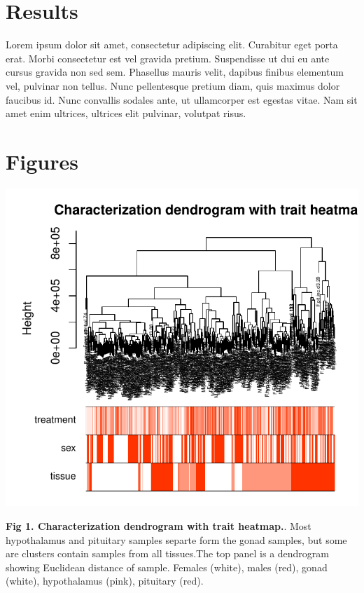 \documentclass[10pt,letterpaper]{article}
\begin{document}
\hypertarget{results}{%
\section{Results}\label{results}}

Lorem ipsum dolor sit amet, consectetur adipiscing elit. Curabitur eget
porta erat. Morbi consectetur est vel gravida pretium. Suspendisse ut
dui eu ante cursus gravida non sed sem. Phasellus mauris velit, dapibus
finibus elementum vel, pulvinar non tellus. Nunc pellentesque pretium
diam, quis maximus dolor faucibus id. Nunc convallis sodales ante, ut
ullamcorper est egestas vitae. Nam sit amet enim ultrices, ultrices elit
pulvinar, volutpat risus.

\hypertarget{figures}{%
\section{Figures}\label{figures}}

\includegraphics{manuscript_draft_files/figure-latex/wgcna-1.pdf}

\textbf{Fig 1. Characterization dendrogram with trait heatmap.}. Most
hypothalamus and pituitary samples separte form the gonad samples, but
some are clusters contain samples from all tissues.The top panel is a
dendrogram showing Euclidean distance of sample. Females (white), males
(red), gonad (white), hypothalamus (pink), pituitary (red).
\end{document}
